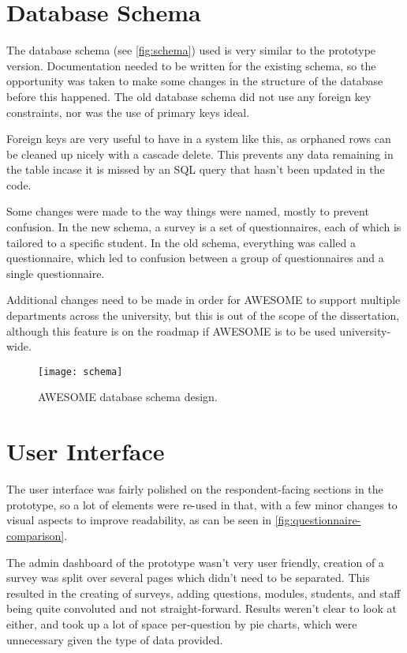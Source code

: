 	\section{Database Schema}
	
	The database schema (see \autoref{fig:schema}) used is very similar to the prototype version.
	Documentation needed to be written for the existing schema, so the opportunity was taken to make some changes in the structure of the database before this happened.
	The old database schema did not use any foreign key constraints, nor was the use of primary keys ideal.
	
	Foreign keys are very useful to have in a system like this, as orphaned rows can be cleaned up nicely with a cascade delete.
	This prevents any data remaining in the table incase it is missed by an \ac{SQL} query that hasn't been updated in the code.
	
	Some changes were made to the way things were named, mostly to prevent confusion.
	In the new schema, a survey is a set of questionnaires, each of which is tailored to a specific student.
	In the old schema, everything was called a questionnaire, which led to confusion between a group of questionnaires and a single questionnaire.

	Additional changes need to be made in order for \ac{AWESOME} to support multiple departments across the university, but this is out of the scope of the dissertation, although this feature is on the roadmap if \ac{AWESOME} is to be used university-wide.
	
	\begin{figure}[H]
		\texttt{[image: schema]}
		\caption{\ac{AWESOME} database schema design.}
		\label{fig:schema}
	\end{figure}
	
	\section{User Interface}
	
	The user interface was fairly polished on the respondent-facing sections in the prototype, so a lot of elements were re-used in that, with a few minor changes to visual aspects to improve readability, as can be seen in \autoref{fig:questionnaire-comparison}.
	
	The admin dashboard of the prototype wasn't very user friendly, creation of a survey was split over several pages which didn't need to be separated.
	This resulted in the creating of surveys, adding questions, modules, students, and staff being quite convoluted and not straight-forward.
	Results weren't clear to look at either, and took up a lot of space per-question by pie charts, which were unnecessary given the type of data provided.
	
